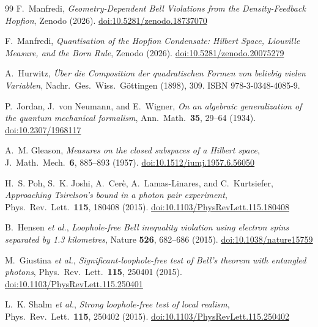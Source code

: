 \documentclass[11pt,a4paper]{article}
\theoremstyle{definition}
\theoremstyle{remark}
\begin{document}
\begin{thebibliography}{99}
F.~Manfredi,
\textit{Geometry-Dependent Bell Violations from the Density-Feedback Hopfion},
Zenodo (2026).
\href{https://doi.org/10.5281/zenodo.18737070}{doi:10.5281/zenodo.18737070}

F.~Manfredi,
\textit{Quantisation of the Hopfion Condensate: Hilbert Space, Liouville Measure, and the Born Rule},
Zenodo (2026).
\href{https://doi.org/10.5281/zenodo.20075279}{doi:10.5281/zenodo.20075279}

A.~Hurwitz,
\textit{\"Uber die Composition der quadratischen Formen von beliebig vielen
Variablen},
Nachr.\ Ges.\ Wiss.\ G\"ottingen (1898), 309.
ISBN 978-3-0348-4085-9.
 
P.~Jordan, J.~von Neumann, and E.~Wigner,
\textit{On an algebraic generalization of the quantum mechanical formalism},
Ann.\ Math.\ \textbf{35}, 29--64 (1934).
\href{https://doi.org/10.2307/1968117}{doi:10.2307/1968117}
 
A.~M. Gleason,
\textit{Measures on the closed subspaces of a Hilbert space},
J.\ Math.\ Mech.\ \textbf{6}, 885--893 (1957).
\href{https://doi.org/10.1512/iumj.1957.6.56050}{doi:10.1512/iumj.1957.6.56050}
 
H.~S. Poh, S.~K. Joshi, A.~Cer\`{e}, A.~Lamas-Linares, and C.~Kurtsiefer,
\textit{Approaching Tsirelson's bound in a photon pair experiment},
Phys.\ Rev.\ Lett.\ \textbf{115}, 180408 (2015).
\href{https://doi.org/10.1103/PhysRevLett.115.180408}{doi:10.1103/PhysRevLett.115.180408}
 
B.~Hensen \textit{et al.},
\textit{Loophole-free Bell inequality violation using electron spins
  separated by 1.3 kilometres},
Nature \textbf{526}, 682--686 (2015).
\href{https://doi.org/10.1038/nature15759}{doi:10.1038/nature15759}
 
M.~Giustina \textit{et al.},
\textit{Significant-loophole-free test of Bell's theorem with entangled photons},
Phys.\ Rev.\ Lett.\ \textbf{115}, 250401 (2015).
\href{https://doi.org/10.1103/PhysRevLett.115.250401}{doi:10.1103/PhysRevLett.115.250401}
 
L.~K. Shalm \textit{et al.},
\textit{Strong loophole-free test of local realism},
Phys.\ Rev.\ Lett.\ \textbf{115}, 250402 (2015).
\href{https://doi.org/10.1103/PhysRevLett.115.250402}{doi:10.1103/PhysRevLett.115.250402}
 

\end{thebibliography}
\end{document}
